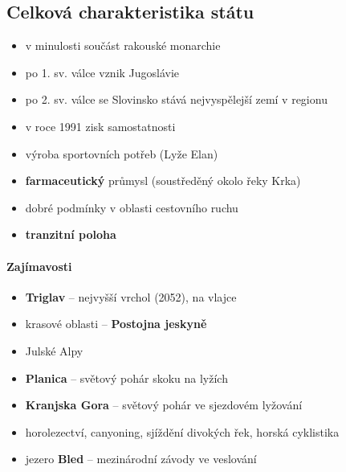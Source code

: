 \subsection{Celková charakteristika státu}
\begin{itemize}
\item v minulosti součást rakouské monarchie
\item po 1. sv. válce vznik Jugoslávie
\item po 2. sv. válce se Slovinsko stává nejvyspělejší zemí v regionu
\item v roce 1991 zisk samostatnosti
\item výroba sportovních potřeb (Lyže Elan)
\item \textbf{farmaceutický} průmysl (soustředěný okolo řeky Krka)
\item dobré podmínky v oblasti cestovního ruchu
\item \textbf{tranzitní poloha}
\end{itemize}

\paragraph{Zajímavosti}
\begin{itemize}
\item \textbf{Triglav} -- nejvyšší vrchol (2052), na vlajce 
\item krasové oblasti -- \textbf{Postojna jeskyně}
\item Julské Alpy
\item \textbf{Planica} -- světový pohár skoku na lyžích
\item \textbf{Kranjska Gora} -- světový pohár ve sjezdovém lyžování
\item horolezectví, canyoning, sjíždění divokých řek, horská cyklistika
\item jezero \textbf{Bled} -- mezinárodní závody ve veslování
\end{itemize}






